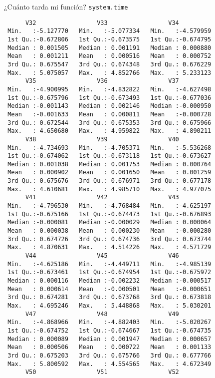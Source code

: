 \documentclass[xcolor={usenames,svgnames,dvipsnames}]{beamer}
\begin{document}
\begin{frame}[label={sec:org4570aee},fragile]{¿Cuánto tarda mi función? \texttt{system.time}}
\begin{verbatim}
      V32                 V33                 V34           
 Min.   :-5.127770   Min.   :-5.077334   Min.   :-4.579959  
 1st Qu.:-0.672806   1st Qu.:-0.673575   1st Qu.:-0.674795  
 Median : 0.001505   Median : 0.001191   Median : 0.000880  
 Mean   : 0.001211   Mean   : 0.000516   Mean   : 0.000752  
 3rd Qu.: 0.675547   3rd Qu.: 0.674348   3rd Qu.: 0.676229  
 Max.   : 5.075057   Max.   : 4.852766   Max.   : 5.233123  
      V35                 V36                 V37           
 Min.   :-4.900995   Min.   :-4.832822   Min.   :-4.627498  
 1st Qu.:-0.675796   1st Qu.:-0.673493   1st Qu.:-0.677036  
 Median :-0.001143   Median : 0.002146   Median :-0.000950  
 Mean   :-0.001633   Mean   : 0.000811   Mean   :-0.000728  
 3rd Qu.: 0.672544   3rd Qu.: 0.675353   3rd Qu.: 0.675966  
 Max.   : 4.650680   Max.   : 4.959822   Max.   : 4.890211  
      V38                 V39                 V40           
 Min.   :-4.734693   Min.   :-4.705371   Min.   :-5.536268  
 1st Qu.:-0.674062   1st Qu.:-0.673118   1st Qu.:-0.673627  
 Median : 0.001038   Median : 0.001753   Median : 0.000764  
 Mean   : 0.000902   Mean   : 0.001650   Mean   : 0.001259  
 3rd Qu.: 0.675676   3rd Qu.: 0.676971   3rd Qu.: 0.677178  
 Max.   : 4.610681   Max.   : 4.985710   Max.   : 4.977075  
      V41                 V42                 V43           
 Min.   :-4.796530   Min.   :-4.768484   Min.   :-4.625197  
 1st Qu.:-0.675166   1st Qu.:-0.674473   1st Qu.:-0.676893  
 Median :-0.000081   Median :-0.000029   Median : 0.000064  
 Mean   : 0.000038   Mean   : 0.000230   Mean   :-0.000280  
 3rd Qu.: 0.674726   3rd Qu.: 0.674736   3rd Qu.: 0.673744  
 Max.   : 4.870631   Max.   : 4.514226   Max.   : 4.571729  
      V44                 V45                 V46           
 Min.   :-4.625186   Min.   :-4.449711   Min.   :-4.985139  
 1st Qu.:-0.673461   1st Qu.:-0.674954   1st Qu.:-0.675972  
 Median : 0.000116   Median :-0.002232   Median :-0.000517  
 Mean   : 0.000614   Mean   :-0.000501   Mean   :-0.000651  
 3rd Qu.: 0.674281   3rd Qu.: 0.673768   3rd Qu.: 0.673818  
 Max.   : 4.695246   Max.   : 5.448868   Max.   : 5.030201  
      V47                 V48                 V49           
 Min.   :-4.868966   Min.   :-4.882403   Min.   :-5.020267  
 1st Qu.:-0.674752   1st Qu.:-0.674667   1st Qu.:-0.674735  
 Median : 0.000089   Median : 0.001947   Median : 0.000657  
 Mean   : 0.000506   Mean   : 0.000722   Mean   : 0.001133  
 3rd Qu.: 0.675203   3rd Qu.: 0.675766   3rd Qu.: 0.677766  
 Max.   : 5.800592   Max.   : 4.554565   Max.   : 4.672349  
      V50                 V51                 V52           

\end{verbatim}
\end{frame}
\end{document}
